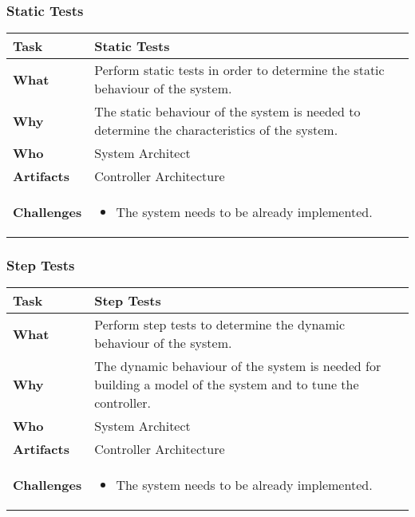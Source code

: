 \subsubsection{Static Tests}
\begin{minipage}{\textwidth}
 \label{table:ch6_Task_Static_Tests}
\begin{tabular}
	{|m{3cm}|m{10cm}|} \hline \bfseries Task & Static Tests\\
	\hline \bfseries What & Perform static tests in order to determine the static behaviour of the system.\\
	\hline \bfseries Why & The static behaviour of the system is needed to determine the characteristics of the system.\\
	\hline \bfseries Who & System Architect\\
	\hline \bfseries Artifacts & Controller Architecture\\
	\hline \bfseries Challenges & 
	\begin{itemize}
		\item The system needs to be already implemented.
	\end{itemize}
	\\
	\hline 
\end{tabular}
\end{minipage}

\subsubsection{Step Tests}
\begin{minipage}{\textwidth}
 \label{table:ch6_Task_Step_Tests}
\begin{tabular}
	{|m{3cm}|m{10cm}|} \hline \bfseries Task & Step Tests\\
	\hline \bfseries What & Perform step tests to determine the dynamic behaviour of the system.\\
	\hline \bfseries Why & The dynamic behaviour of the system is needed for building a model of the system and to tune the controller.\\
	\hline \bfseries Who & System Architect\\
	\hline \bfseries Artifacts & Controller Architecture\\
	\hline \bfseries Challenges & 
	\begin{itemize}
		\item The system needs to be already implemented.
	\end{itemize}
	\\
	\hline 
\end{tabular}
\end{minipage}

